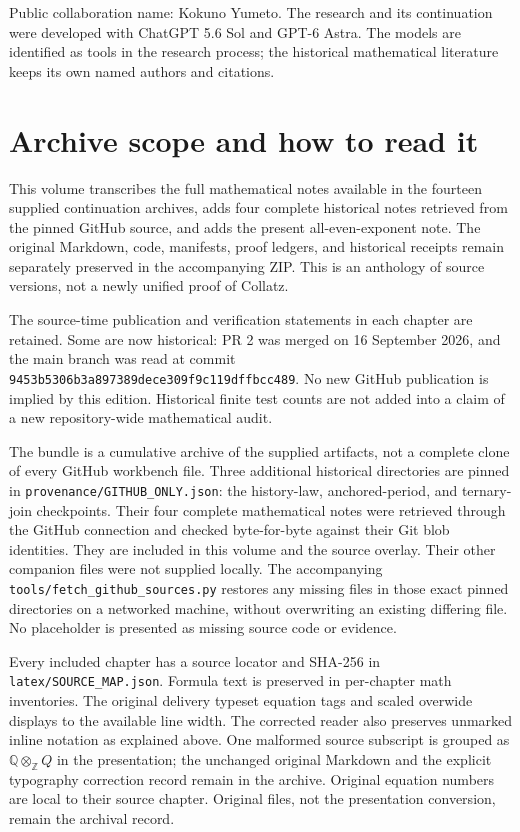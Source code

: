 \documentclass[11pt,oneside]{book}
\begin{document}
Public collaboration name: Kokuno Yumeto. The research and its continuation
were developed with ChatGPT 5.6 Sol and GPT-6 Astra. The models are identified
as tools in the research process; the historical mathematical literature keeps
its own named authors and citations.

\chapter*{Archive scope and how to read it}
This volume transcribes the full mathematical notes available in the fourteen
supplied continuation archives, adds four complete historical notes retrieved
from the pinned GitHub source, and adds the present all-even-exponent note.
The original Markdown, code, manifests, proof ledgers, and historical receipts
remain separately preserved in the accompanying ZIP. This is an anthology of
source versions, not a newly unified proof of Collatz.

The source-time publication and verification statements in each chapter are
retained. Some are now historical: PR 2 was merged on 16 September 2026, and the
main branch was read at commit
\texttt{9453b5306b3a897389dece309f9c119dffbcc489}.
No new GitHub publication is implied by this edition. Historical finite test
counts are not added into a claim of a new repository-wide mathematical audit.

The bundle is a cumulative archive of the supplied artifacts, not a complete
clone of every GitHub workbench file. Three additional historical directories
are pinned in \texttt{provenance/GITHUB\_ONLY.json}: the history-law,
anchored-period, and ternary-join checkpoints. Their four complete mathematical
notes were retrieved through the GitHub connection and checked byte-for-byte
against their Git blob identities. They are included in this volume and the
source overlay. Their other companion files were not supplied locally.
The accompanying \texttt{tools/fetch\_github\_sources.py} restores any missing
files in those exact pinned directories on a networked machine, without
overwriting an existing differing file. No placeholder is presented as missing
source code or evidence.

Every included chapter has a source locator and SHA-256 in
\texttt{latex/SOURCE\_MAP.json}. Formula text is preserved in per-chapter math
inventories. The original delivery typeset equation tags and scaled
overwide displays to the available line width. The corrected reader also preserves unmarked inline notation as explained above. One malformed source subscript is grouped as
$\mathbb Q\otimes_{\mathbb Z}Q$ in the presentation; the unchanged original
Markdown and the explicit typography correction record remain in the archive.
Original equation numbers are local to their source chapter. Original files, not the presentation conversion,
remain the archival record.
\end{document}
